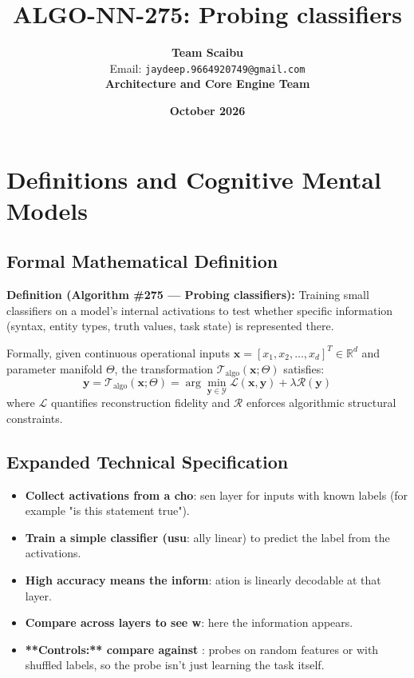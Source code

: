 \documentclass[11pt,a4paper]{article}
\title{\textbf{ALGO-NN-275: Probing classifiers}}
\author{\textbf{Team Scaibu} \\ \small Email: \texttt{jaydeep.9664920749@gmail.com} \\ \small \textbf{Architecture and Core Engine Team}}
\date{\textbf{October 2026}}
\theoremstyle{definition}
\begin{document}
\maketitle

\section{Definitions and Cognitive Mental Models}

\subsection{Formal Mathematical Definition}
\textbf{Definition (Algorithm \#275 --- Probing classifiers):}
Training small classifiers on a model's internal activations to test whether specific information (syntax, entity types, truth values, task state) is represented there.

Formally, given continuous operational inputs $\mathbf{x} = [x_1, x_2, \dots, x_d]^T \in \mathbb{R}^d$ and parameter manifold $\Theta$, the transformation $\mathcal{T}_{\text{algo}}(\mathbf{x}; \Theta)$ satisfies:
{\boldmath
\begin{equation}
\mathbf{y} = \mathcal{T}_{\text{algo}}(\mathbf{x}; \Theta) = \arg\min_{\mathbf{y} \in \mathcal{Y}} \mathcal{L}(\mathbf{x}, \mathbf{y}) + \lambda \mathcal{R}(\mathbf{y})
\end{equation}
}
where $\mathcal{L}$ quantifies reconstruction fidelity and $\mathcal{R}$ enforces algorithmic structural constraints.

\subsection{Expanded Technical Specification}
\begin{itemize}
\item \textbf{Collect activations from a cho}: sen layer for inputs with known labels (for example "is this statement true").
\item \textbf{Train a simple classifier (usu}: ally linear) to predict the label from the activations.
\item \textbf{High accuracy means the inform}: ation is linearly decodable at that layer.
\item \textbf{Compare across layers to see w}: here the information appears.
\item \textbf{**Controls:** compare against }: probes on random features or with shuffled labels, so the probe isn't just learning the task itself.
\end{itemize}
\end{document}
